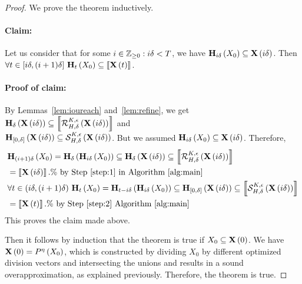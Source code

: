 \begin{proof}
We prove the theorem inductively.

\paragraph{Claim:}  Let us consider that for some
$i\in\mathbb{Z}_{\geq 0}:i\delta<T$, we have
$\mathbf{H}_{i\delta}\left(X_0\right)\subseteq\mathbf{X}\left(i\delta\right)$.  Then $\forall
t\in[i\delta,(i+1)\delta]~\mathbf{H}_{t}\left(X_0\right)\subseteq \left\llbracket{\mathbf{X}\left(t\right)}\right\rrbracket$.

\paragraph{Proof of claim:}
By Lemmas~\ref{lem:ioureach} and~\ref{lem:refine}, we get
$\mathbf{H}_{\delta}\left(\mathbf{X}\left(i\delta\right)\right)\subseteq \left\llbracket{\mathcal{R}_{H,\delta}^{K,\epsilon}\left(\mathbf{X}\left(i\delta\right)\right)}\right\rrbracket$
and\\
$\mathbf{H}_{[0,\delta]}\left(\mathbf{X}\left(i\delta\right)\right)\subseteq \mathcal{S}_{H,\delta}^{K,\epsilon}\left(\mathbf{X}\left(i\delta\right)\right)$.
But we assumed $\mathbf{H}_{i\delta}\left(X_0\right)\subseteq \mathbf{X}\left(i\delta\right)$.
Therefore,
%
\begin{align*}
& \reach{H}{(i+1)\delta}{X_0}
= \reach{H}{\delta}{\reach{H}{i\delta}{X_0}} \subseteq \reach{H}{\delta}{\tr{X}{i\delta}}
\subseteq \ztset{\flow{H}{\delta}{K}{\epsilon}{\tr{X}{i\delta}}}\\
& = \ztset{\tr{X}{i\delta}}.\%~\text{by Step~\ref{step:1} in Algorithm~\ref{alg:main}}\\
%
& \forall t\in(i\delta,(i+1)\delta)~\reach{H}{t}{X_0}
= \reach{H}{t-i\delta}{\reach{H}{i\delta}{X_0}} \subseteq \reach{H}{[0,\delta]}{\tr{X}{i\delta}}
\subseteq \ztset{\ivflow{H}{\delta}{K}{\epsilon}{\tr{X}{i\delta}}}\\
& = \ztset{\tr{X}{t}}. \%~\text{by Step~\ref{step:2} Algorithm~\ref{alg:main}}
\end{align*}
%
This proves the claim made above.

Then it follows by induction that the theorem is true if
$X_0\subseteq \mathbf{X}\left(0\right)$.  We have $\mathbf{X}\left(0\right) = P^{\eta}\left(X_0\right)$,
which is constructed by dividing $X_0$ by different optimized division
vectors and intersecting the unions and results in a sound
overapproximation, as explained previously.  Therefore, the theorem is
true.
\end{proof}
%
